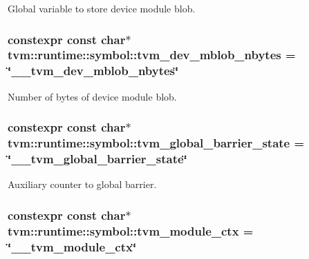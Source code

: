 Global variable to store device module blob. 

\subsubsection[{\texorpdfstring{tvm\+\_\+dev\+\_\+mblob\+\_\+nbytes}{tvm_dev_mblob_nbytes}}]{\setlength{\rightskip}{0pt plus 5cm}constexpr const char$\ast$ tvm\+::runtime\+::symbol\+::tvm\+\_\+dev\+\_\+mblob\+\_\+nbytes = \char`\"{}\+\_\+\+\_\+tvm\+\_\+dev\+\_\+mblob\+\_\+nbytes\char`\"{}}\hypertarget{namespacetvm_1_1runtime_1_1symbol_aba35391edf7c3a25628bf99ed42cdca1}{}\label{namespacetvm_1_1runtime_1_1symbol_aba35391edf7c3a25628bf99ed42cdca1}


Number of bytes of device module blob. 

\subsubsection[{\texorpdfstring{tvm\+\_\+global\+\_\+barrier\+\_\+state}{tvm_global_barrier_state}}]{\setlength{\rightskip}{0pt plus 5cm}constexpr const char$\ast$ tvm\+::runtime\+::symbol\+::tvm\+\_\+global\+\_\+barrier\+\_\+state = \char`\"{}\+\_\+\+\_\+tvm\+\_\+global\+\_\+barrier\+\_\+state\char`\"{}}\hypertarget{namespacetvm_1_1runtime_1_1symbol_ac21d436bd65464b49858ba4bc55fb3ec}{}\label{namespacetvm_1_1runtime_1_1symbol_ac21d436bd65464b49858ba4bc55fb3ec}


Auxiliary counter to global barrier. 

\subsubsection[{\texorpdfstring{tvm\+\_\+module\+\_\+ctx}{tvm_module_ctx}}]{\setlength{\rightskip}{0pt plus 5cm}constexpr const char$\ast$ tvm\+::runtime\+::symbol\+::tvm\+\_\+module\+\_\+ctx = \char`\"{}\+\_\+\+\_\+tvm\+\_\+module\+\_\+ctx\char`\"{}}\hypertarget{namespacetvm_1_1runtime_1_1symbol_aeebcec34a8e6cc24c495710aedea5de9}{}\label{namespacetvm_1_1runtime_1_1symbol_aeebcec34a8e6cc24c495710aedea5de9}


